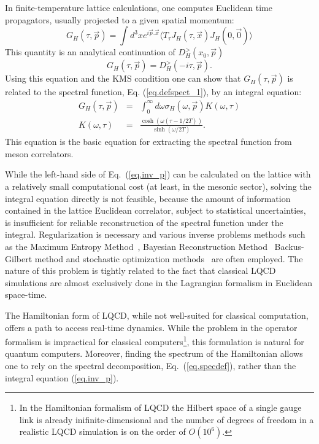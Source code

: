 \documentclass[10pt]{article}
\begin{document}
In finite-temperature lattice calculations, one computes
Euclidean time propagators, usually
projected to a given spatial momentum:
\begin{equation}
G_H(\tau, \vec{p}) = \int d^3x e^{i \vec{p}.\vec{x}}
\langle T_{\tau} J_H(\tau, \vec{x}) J_H(0,
\vec{0}) \rangle
\end{equation}
This quantity is an analytical continuation
of $D^{>}_H(x_0,\vec{p})$
\begin{equation}
G_H(\tau,\vec{p})=D^{>}_H(-i\tau,\vec{p}).
\end{equation}
Using this equation and the KMS condition
one can
show that $G_H(\tau,\vec{p})$ is related to the
spectral
function, Eq. (\ref{eq.defspect_1}), by an integral equation:
\begin{eqnarray}
G_H(\tau, \vec{p}) &=& \int_0^{\infty} d \omega
\sigma_H(\omega,\vec{p}) K(\omega, \tau) \label{eq.spect} \label{eq.inv_p}\\
K(\omega, \tau) &=& \frac{\cosh(\omega(\tau-1/2
T))}{\sinh(\omega/2 T)}.
\label{eq.kernel}
\end{eqnarray}
This equation is the basic equation for extracting the spectral
function from meson correlators.

While the left-hand side of Eq.~(\ref{eq.inv_p}) can be calculated on the
lattice with a relatively small computational cost (at least, in the mesonic
sector), solving the integral equation directly is not feasible, because the
amount of information contained in the lattice Euclidean correlator,
subject to statistical uncertainties, is insufficient
for reliable reconstruction of the spectral function
under the integral. Regularization is necessary and various inverse problems
methods such as the Maximum Entropy Method~\cite{Jarrell:1996rrw},
Bayesian Reconstruction Method~\cite{Burnier:2013nla}
Backus-Gilbert method and
stochastic optimization methods~\cite{Ding:2017std}
are often employed.
The nature of this problem is tightly related to the fact that classical
LQCD simulations are almost exclusively done in the Lagrangian formalism
in Euclidean space-time.

The Hamiltonian form of LQCD, while not well-suited for classical computation,
offers a path to access real-time dynamics. While the problem in the operator
formalism is impractical for classical computers\footnote{In the Hamiltonian
formalism of LQCD the Hilbert space of a single gauge link is already
inifinite-dimensional and the number of degrees of freedom in a realistic
LQCD simulation is on the order of $O(10^6)$.}, this formulation is natural
for quantum computers. Moreover, finding the spectrum of the Hamiltonian
allows one to rely on the spectral decomposition, Eq.~(\ref{eq.specdef}), rather
than the integral equation (\ref{eq.inv_p}).
\end{document}
